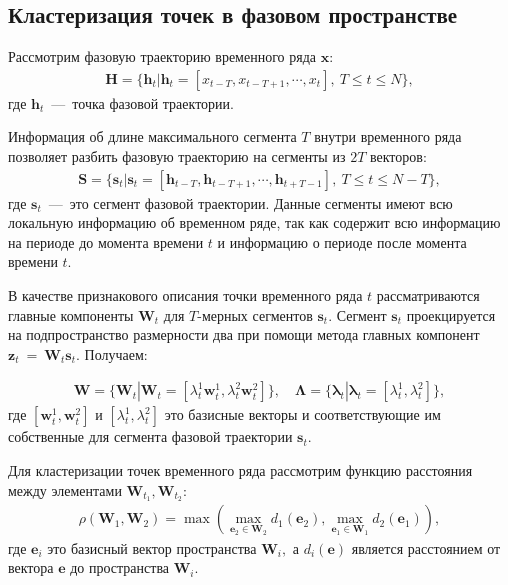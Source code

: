 \subsection{Кластеризация точек в фазовом пространстве}
Рассмотрим фазовую траекторию временного ряда $\textbf{x}$:
\[
\label{eq:cl:1}
\begin{aligned}
\mathbf{H} = \{\textbf{h}_t| \textbf{h}_t = [x_{t-T}, x_{t-T+1}, \cdots, x_{t}],~T\leq t\leq N\},
\end{aligned}
\]
где $\textbf{h}_t$~---~точка фазовой траектории.

Информация об длине максимального сегмента $T$ внутри временного ряда позволяет разбить фазовую траекторию на сегменты из $2T$ векторов:
\[
\label{eq:cl:2}
\begin{aligned}
\mathbf{S} = \{\textbf{s}_t| \textbf{s}_t = [\textbf{h}_{t-T}, \textbf{h}_{t-T+1}, \cdots, \textbf{h}_{t+T-1}],~T\leq t\leq N-T\},
\end{aligned}
\]
где $\textbf{s}_t$~---~это сегмент фазовой траектории. Данные сегменты имеют всю локальную информацию об временном ряде, так как содержит всю информацию на периоде до момента времени $t$ и информацию о периоде после момента времени $t$.

В качестве признакового описания точки временного ряда $t$ рассматриваются главные компоненты $\textbf{W}_t$ для $T\text{-мерных}$ сегментов $\textbf{s}_t$. Сегмент $\textbf{s}_t$ проекцируется на подпространство размерности два при помощи метода главных  компонент $\textbf{z}_t~=~\textbf{W}_t\textbf{s}_t$. Получаем:

\[
\label{eq:cl:3}
\begin{aligned}
\mathbf{W} = \{\textbf{W}_t| \textbf{W}_t = [\lambda^1_t\textbf{w}^1_t, \lambda^2_t\textbf{w}^2_t]\}, \quad \bm{\Lambda} = \{\bm{\lambda}_t| \bm{\lambda}_t=[\lambda^1_t, \lambda^2_t]\},
\end{aligned}
\]
где $[\textbf{w}^1_t, \textbf{w}^2_t]$ и $[\lambda^1_t, \lambda^2_t]$ это базисные векторы и соответствующие им собственные для сегмента фазовой траектории $\textbf{s}_t$.

Для кластеризации точек временного ряда рассмотрим функцию расстояния между элементами $\mathbf{W}_{t_1},\mathbf{W}_{t_2}$:
\[
\label{eq:cl:4}
\begin{aligned}
\rho\left(\textbf{W}_1, \textbf{W}_2\right) = \max\left(\max_{\textbf{e}_2 \in \textbf{W}_2} d_{1}\left(\textbf{e}_2\right), \max_{\textbf{e}_1 \in \textbf{W}_1} d_{2}\left(\textbf{e}_1\right)\right),
\end{aligned}
\]
где  $\textbf{e}_i$ это базисный вектор пространства $\textbf{W}_i,$ а $d_i\left(\textbf{e}\right)$ является расстоянием от вектора $\textbf{e}$ до пространства $\textbf{W}_i$.

